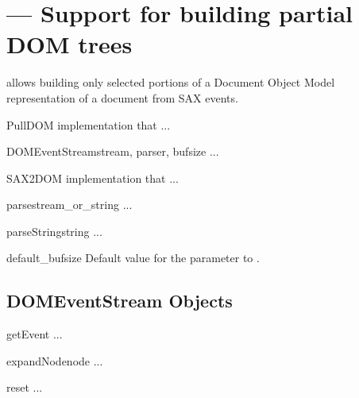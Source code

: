 \section{ ---
         Support for building partial DOM trees}



 allows building only selected portions of a
Document Object Model representation of a document from SAX events.


\begin{classdesc}{PullDOM}{}
   implementation that ...
\end{classdesc}


\begin{classdesc}{DOMEventStream}{stream, parser, bufsize}
  ...
\end{classdesc}


\begin{classdesc}{SAX2DOM}{}
   implementation that ...
\end{classdesc}


\begin{funcdesc}{parse}{stream_or_string}
  ...
\end{funcdesc}


\begin{funcdesc}{parseString}{string}
  ...
\end{funcdesc}


\begin{datadesc}{default_bufsize}
  Default value for the  parameter to .
\end{datadesc}


\subsection{DOMEventStream Objects \label{domeventstream-objects}}


\begin{methoddesc}[DOMEventStream]{getEvent}{}
  ...
\end{methoddesc}

\begin{methoddesc}[DOMEventStream]{expandNode}{node}
  ...
\end{methoddesc}

\begin{methoddesc}[DOMEventStream]{reset}{}
  ...
\end{methoddesc}
